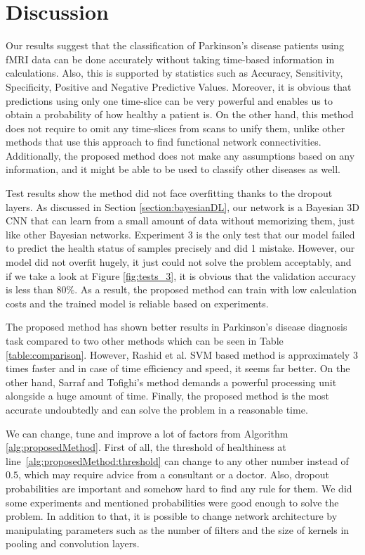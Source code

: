 \documentclass[preprint,12pt]{elsarticle}
\begin{document}
\section{Discussion}
\label{section:discussion}

Our results suggest that the classification of Parkinson’s disease patients using fMRI data can be done accurately without taking time-based information in calculations. Also, this is supported by statistics such as Accuracy, Sensitivity, Specificity, Positive and Negative Predictive Values. Moreover, it is obvious that predictions using only one time-slice can be very powerful and enables us to obtain a probability of how healthy a patient is. On the other hand, this method does not require to omit any time-slices from scans to unify them, unlike other methods that use this approach to find functional network connectivities. Additionally, the proposed method does not make any assumptions based on any information, and it might be able to be used to classify other diseases as well.

Test results show the method did not face overfitting thanks to the dropout layers. As discussed in Section \ref{section:bayesianDL}, our network is a Bayesian 3D CNN that can learn from a small amount of data without memorizing them, just like other Bayesian networks. Experiment 3 is the only test that our model failed to predict the health status of samples precisely and did 1 mistake. However, our model did not overfit hugely, it just could not solve the problem acceptably, and if we take a look at Figure \ref{fig:tests_3}, it is obvious that the validation accuracy is less than $80\%$. As a result, the proposed method can train with low calculation costs and the trained model is reliable based on experiments.

The proposed method has shown better results in Parkinson's disease diagnosis task compared to two other methods which can be seen in Table \ref{table:comparison}. However, Rashid et al. SVM based method is approximately 3 times faster and in case of time efficiency and speed, it seems far better. On the other hand, Sarraf and Tofighi's method demands a powerful processing unit alongside a huge amount of time. Finally, the proposed method is the most accurate undoubtedly and can solve the problem in a reasonable time.

We can change, tune and improve a lot of factors from Algorithm \ref{alg:proposedMethod}. First of all, the threshold of healthiness at line~\ref{alg:proposedMethod:threshold} can change to any other number instead of $0.5$, which may require advice from a consultant or a doctor. Also, dropout probabilities are important and somehow hard to find any rule for them. We did some experiments and mentioned probabilities were good enough to solve the problem. In addition to that, it is possible to change network architecture by manipulating parameters such as the number of filters and the size of kernels in pooling and convolution layers.
\end{document}
